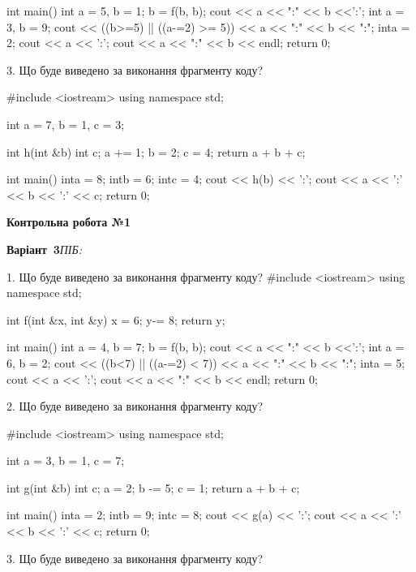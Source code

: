 \documentclass[11pt]{article}
\begin{document}
int main(){
    int a = 5, b = 1;
    b = f(b, b);
    cout << a << ":" << b <<':';
    {
        int a = 3, b = 9;
        cout << ((b>=5) || ((a-=2) >= 5))
             << a << ":" << b << ":";
    }
    {
        inta = 2;
        cout << a << ':';
    }
    cout << a << ":" << b << endl;
    return 0;
}


3. Що буде виведено за виконання фрагменту коду?

#include <iostream>
using namespace std;

int a = 7, b = 1, c = 3;

int h(int &b){
int c;    a += 1;
    b = 2;
    c = 4;
    return a + b + c;
}

int main(){
    inta = 8;
    intb = 6;
    intc = 4;
    cout << h(b) << ':';
    cout << a << ':' << b << ':' << c;
    return 0; 
}




\newpage
{\large\textbf{Контрольна робота №1}}

\textbf{Варіант \No\,3}\hfill \textit{ПІБ:}\,\underline{\hspace{60mm}}
\vspace{4mm}

1. Що буде виведено за виконання фрагменту коду?
#include <iostream>
using namespace std;

int f(int &x, int &y){
    x = 6;
    y-= 8;
    return y;
}

int main(){
    int a = 4, b = 7;
    b = f(b, b);
    cout << a << ":" << b <<':';
    {
        int a = 6, b = 2;
        cout << ((b<7) || ((a-=2) < 7))
             << a << ":" << b << ":";
    }
    {
        inta = 5;
        cout << a << ':';
    }
    cout << a << ":" << b << endl;
    return 0;
}


2. Що буде виведено за виконання фрагменту коду?

#include <iostream>
using namespace std;

int a = 3, b = 1, c = 7;

int g(int &b){
int c;    a = 2;
    b -= 5;
    c = 1;
    return a + b + c;
}

int main(){
    inta = 2;
    intb = 9;
    intc = 8;
    cout << g(a) << ':';
    cout << a << ':' << b << ':' << c;
    return 0; 
}

3. Що буде виведено за виконання фрагменту коду?
\end{document}
